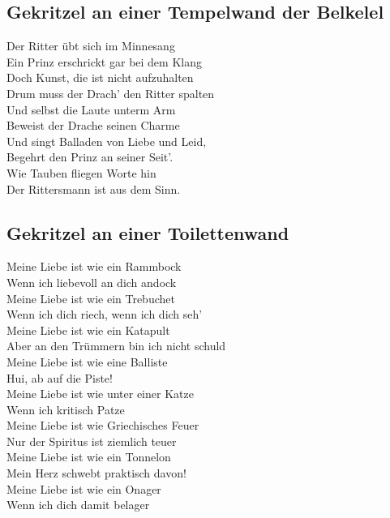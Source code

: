 \documentclass[final]{multiversum}
\begin{document}
\subsection{Gekritzel an einer Tempelwand der Belkelel}
Der Ritter übt sich im Minnesang\\
Ein Prinz erschrickt gar bei dem Klang\\
Doch Kunst, die ist nicht aufzuhalten\\
Drum muss der Drach' den Ritter spalten\\
Und selbst die Laute unterm Arm\\
Beweist der Drache seinen Charme\\
Und singt Balladen von Liebe und Leid,\\
Begehrt den Prinz an seiner Seit'.\\
Wie Tauben fliegen Worte hin\\
Der Rittersmann ist aus dem Sinn.\\

\subsection{Gekritzel an einer Toilettenwand}
Meine Liebe ist wie ein Rammbock\\
Wenn ich liebevoll an dich andock\\
Meine Liebe ist wie ein Trebuchet\\
Wenn ich dich riech, wenn ich dich seh'\\
Meine Liebe ist wie ein Katapult\\
Aber an den Trümmern bin ich nicht schuld\\
Meine Liebe ist wie eine Balliste\\
Hui, ab auf die Piste!\\
Meine Liebe ist wie unter einer Katze\\
Wenn ich kritisch Patze\\
Meine Liebe ist wie Griechisches Feuer\\
Nur der Spiritus ist ziemlich teuer\\
Meine Liebe ist wie ein Tonnelon\\
Mein Herz schwebt praktisch davon!\\
Meine Liebe ist wie ein Onager\\
Wenn ich dich damit belager\\
\end{document}
